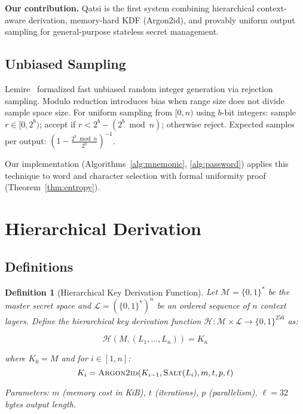 \documentclass[11pt]{article}
\newtheorem{definition}{Definition}
\begin{document}
\textbf{Our contribution.} Qatsi is the first system combining hierarchical context-aware derivation, memory-hard KDF (Argon2id), and provably uniform output sampling for general-purpose stateless secret management.

\subsection{Unbiased Sampling}

Lemire~\cite{lemire-fast-rejection} formalized fast unbiased random integer generation via rejection sampling. Modulo reduction introduces bias when range size does not divide sample space size. For uniform sampling from $[0, n)$ using $b$-bit integers: sample $r \in [0, 2^b)$; accept if $r < 2^b - (2^b \bmod n)$; otherwise reject. Expected samples per output: $(1 - \frac{2^b \bmod n}{2^b})^{-1}$.

Our implementation (Algorithms~\ref{alg:mnemonic}, \ref{alg:password}) applies this technique to word and character selection with formal uniformity proof (Theorem~\ref{thm:entropy}).

\section{Hierarchical Derivation}

\subsection{Definitions}

\begin{definition}[Hierarchical Key Derivation Function]
\label{def:hkdf}
Let $\mathcal{M} = \{0,1\}^*$ be the master secret space and $\mathcal{L} = (\{0,1\}^*)^n$ be an ordered sequence of $n$ context layers. Define the hierarchical key derivation function $\mathcal{H}: \mathcal{M} \times \mathcal{L} \to \{0,1\}^{256}$ as:

\begin{equation}
\mathcal{H}(M, (L_1, \ldots, L_n)) = K_n
\end{equation}

where $K_0 = M$ and for $i \in [1,n]$:
\begin{equation}
K_i = \textsc{Argon2id}(K_{i-1}, \textsc{Salt}(L_i), m, t, p, \ell)
\end{equation}

Parameters: $m$ (memory cost in KiB), $t$ (iterations), $p$ (parallelism), $\ell = 32$ bytes output length.
\end{definition}
\end{document}
